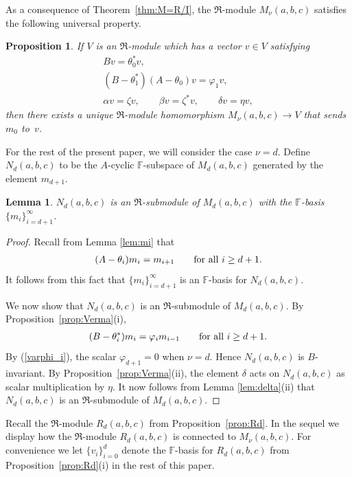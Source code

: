 \documentclass[pdftex]{sigma}
\def\F{\mathbb F}
\numberwithin{equation}{section}
\newtheorem{Lemma}[Theorem]{Lemma}
\newtheorem{Proposition}[Theorem]{Proposition}
 { \theoremstyle{definition}
\newtheorem{Definition}[Theorem]{Definition}
\newtheorem{Example}[Theorem]{Example} }
\begin{document}
As a consequence of Theorem~\ref{thm:M=R/I}, the $\Re$-module $M_\nu(a,b,c)$ satisfies the following universal property.

\begin{Proposition}\label{prop:universal}If $V$ is an $\Re$-module which has a vector $v\in V$ satisfying
\begin{gather*}
Bv=\theta_0^* v,\\
(B-\theta_1^*)(A-\theta_0)v=\varphi_1 v,\\
\alpha v=\zeta v,\qquad\beta v=\zeta^* v,\qquad\delta v=\eta v,
\end{gather*}
then there exists a unique $\Re$-module homomorphism $M_\nu(a,b,c)\to V$ that sends~$m_0$ to~$v$.
\end{Proposition}

For the rest of the present paper, we will consider the case $\nu=d$. Define $N_d(a,b,c)$ to be the $A$-cyclic $\F$-subspace of $M_d(a,b,c)$ generated by the element $m_{d+1}$.

\begin{Lemma}\label{lem:N}$N_d(a,b,c)$ is an $\Re$-submodule of $M_d(a,b,c)$ with the $\F$-basis $\{m_i\}_{i=d+1}^\infty$.
\end{Lemma}
\begin{proof}Recall from Lemma \ref{lem:mi} that
\begin{gather*}
(A-\theta_i) m_i=m_{i+1}\qquad \hbox{for all $i\geq d+1$}.
\end{gather*}
It follows from this fact that $\{m_i\}_{i=d+1}^\infty$ is an $\F$-basis for $N_d(a,b,c)$.

We now show that $N_d(a,b,c)$ is an $\Re$-submodule of $M_d(a,b,c)$. By Proposition~\ref{prop:Verma}(i),
\begin{gather*}
(B-\theta_i^*)m_i=\varphi_i m_{i-1} \qquad\hbox{for all $i\geq d+1$}.
\end{gather*}
By (\ref{varphi_i}), the scalar $\varphi_{d+1}=0$ when $\nu=d$. Hence $N_d(a,b,c)$ is $B$-invariant. By Proposition~\ref{prop:Verma}(ii), the element $\delta$ acts on $N_d(a,b,c)$ as scalar multiplication by $\eta$.
It now follows from Lemma \ref{lem:delta}(ii) that
 $N_d(a,b,c)$ is an $\Re$-submodule of $M_d(a,b,c)$.
\end{proof}

Recall the $\Re$-module $R_d(a,b,c)$ from Proposition~\ref{prop:Rd}. In the sequel we display how the $\Re$-module $R_d(a,b,c)$ is connected to $M_\nu(a,b,c)$. For convenience we let $\{v_i\}_{i=0}^d$ denote the $\F$-basis for $R_d(a,b,c)$ from Proposition~\ref{prop:Rd}(i) in the rest of this paper.
\end{document}
